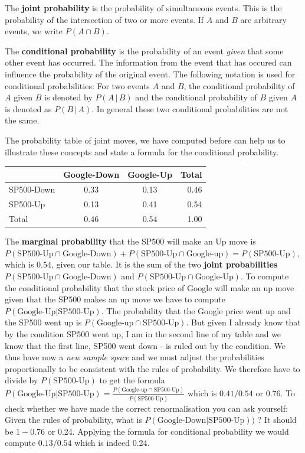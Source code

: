 \documentclass[
]{book}
\providecommand{\tightlist}{%
  \setlength{\itemsep}{0pt}\setlength{\parskip}{0pt}}
\begin{document}
\begin{description}
\tightlist
\item[Joint probability]
The \textbf{joint probability} is the probability of simultaneous events. This is
the probability of the intersection of two or more events. If \(A\) and \(B\) are
arbitrary events, we write \(P(A \cap B)\).
\item[Conditional probability]
The \textbf{conditional probability} is the probability of an event \emph{given} that some other
event has occurred. The information from the event that has occured can influence
the probability of the original event. The following notation is used for
conditional probabilities: For two events \(A\) and \(B\), the conditional probability of
\(A\) given \(B\) is denoted by \(P(A\,|\,B)\) and the conditional probability of \(B\) given
\(A\) is denoted as \(P(B\, |\, A)\). In general these two conditional probabilities are
not the same.
\end{description}

The probability table of joint moves, we have computed before can help us to illustrate
these concepts and state a formula for the conditional probability.

\begin{longtable}[]{@{}lccr@{}}
\toprule
& Google-Down & Google-Up & Total \\
\midrule
\endhead
SP500-Down & 0.33 & 0.13 & 0.46 \\
SP500-Up & 0.13 & 0.41 & 0.54 \\
Total & 0.46 & 0.54 & 1.00 \\
\bottomrule
\end{longtable}

The \textbf{marginal probability} that the SP500 will make an Up move is
\(P(\text{SP500-Up} \cap \text{Google-Down}) + P(\text{SP500-Up} \cap \text{Google-up}) = P(\text{SP500-Up})\), which is 0.54, given our table. It is the sum
of the two \textbf{joint probabilities} \(P(\text{SP500-Up} \cap \text{Google-Down})\) and
\(P(\text{SP500-Up} \cap \text{Google-Up})\). To compute the conditional probability
that the stock price of Google will make an up move given that the SP500 makes an
up move we have to compute \(P(\text{Google-Up} | \text{SP500-Up})\). The probability
that the Google price went up and the SP500 went up is \(P(\text{Google-up} \cap \text{SP500-Up})\).
But given I already know that by the condition SP500 went up, I am in the second line of
my table and we know that the first line, SP500 went down - is ruled out by the
condition. We thus have now a \emph{new sample space} and we must
adjust the probabilities proportionally
to be consistent with the rules of probability. We therefore have to divide by
\(P(\text{SP500-Up})\) to get the formula
\(P(\text{Google-Up} | \text{SP500-Up}) = \frac{P(\text{Google-up} \cap \text{SP500-Up})}{P(\text{SP500-Up})}\) which is \(0.41/0.54\) or \(0.76\).
To check whether we have made the correct renormalisation you can ask yourself: Given the
rules of probability, what is \(P(\text{Google-Down} | \text{SP500-Up}))\) ? It should be
\(1 - 0.76\) or 0.24. Applying the formula for conditional probability we would compute
\(0.13/0.54\) which is indeed 0.24.
\end{document}
